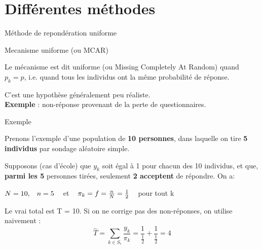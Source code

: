 \section{Différentes méthodes} %

\begin{frame}{}
	
	\huge \begin{center}
		 Méthode de repondération uniforme
	\end{center}
	
\end{frame}


\begin{frame}{Mecanisme uniforme (ou MCAR)}
	
Le mécanisme est dit uniforme (ou Missing Completely At Random)
quand $p_k = p$, i.e. quand tous les individus ont la même probabilité
de réponse. \\ \vspace{0.5cm} 

C’est une hypothèse généralement peu réaliste. \\ \vspace{0.5cm}
\textbf{Exemple} : non-réponse provenant de la perte de questionnaires.
	
\end{frame}


\begin{frame}{Exemple}
	
	Prenons l'exemple d'une population de \textbf{10 personnes}, dans laquelle on tire \textbf{5 individus}
	par sondage aléatoire simple.  \\ \vspace{0.2cm}
	
	Supposons (cas d'école) que $y_k$ soit égal à 1 pour chacun des 10 individus, et que, \textbf{parmi les 5} personnes tirées, seulement \textbf{2 acceptent} de répondre.
	On a: \\ \vspace{0.2cm}
	
	$ N=10, \hspace{3mm} n =5 \hspace{3mm} $ et $ \hspace{3mm} \pi_k = f = \frac{n}{N} = \frac{1}{2} \hspace{3mm} $  pour  tout  k\\ \vspace{0.2cm}
	
	Le vrai total est T = 10. Si on ne corrige pas des non-réponses, on utilise naivement : 
	$$\hat{T} =  \sum_{k \in S_r} \frac{y_k}{\pi_k} = \frac{1}{\frac{1}{2}} + \frac{1}{\frac{1}{2}} = 4$$
	
\end{frame}



